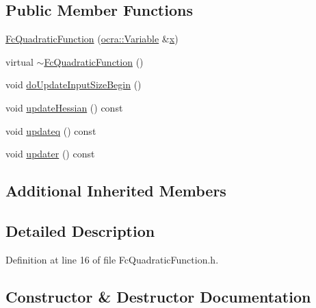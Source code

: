 \subsection*{Public Member Functions}
\begin{DoxyCompactItemize}
\item 
\hyperlink{classocra_1_1FcQuadraticFunction_a85ee0d84a43b16353b1d44740cc3769b}{Fc\+Quadratic\+Function} (\hyperlink{classocra_1_1Variable}{ocra\+::\+Variable} \&\hyperlink{classocra_1_1Function_a28825886d1f149c87b112ec2ec1dd486}{x})
\item 
virtual \hyperlink{classocra_1_1FcQuadraticFunction_a1eef85d7638d6bfc0c2bb3bc9dab8d63}{$\sim$\+Fc\+Quadratic\+Function} ()
\item 
void \hyperlink{classocra_1_1FcQuadraticFunction_a1e350f138eb82cfe3e8cf049942e626c}{do\+Update\+Input\+Size\+Begin} ()
\item 
void \hyperlink{classocra_1_1FcQuadraticFunction_aef068bc86027f29c0fbfaa9d53441cd4}{update\+Hessian} () const
\item 
void \hyperlink{classocra_1_1FcQuadraticFunction_ac6bcfaccbe16a821e0f1d7c29744d138}{updateq} () const
\item 
void \hyperlink{classocra_1_1FcQuadraticFunction_aab41d4b011590ad42766e66df34305da}{updater} () const
\end{DoxyCompactItemize}
\subsection*{Additional Inherited Members}


\subsection{Detailed Description}


Definition at line 16 of file Fc\+Quadratic\+Function.\+h.



\subsection{Constructor \& Destructor Documentation}
\hypertarget{classocra_1_1FcQuadraticFunction_a85ee0d84a43b16353b1d44740cc3769b}{}\label{classocra_1_1FcQuadraticFunction_a85ee0d84a43b16353b1d44740cc3769b} 
